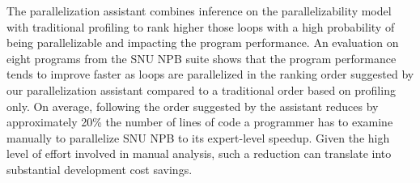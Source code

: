 
The parallelization assistant combines inference on the parallelizability model
with traditional profiling to rank higher those loops with a high probability of being parallelizable and impacting the program performance.
%
An evaluation on eight programs from the SNU NPB suite shows that
the program performance tends to improve faster as loops are parallelized in
the ranking order suggested by our parallelization assistant compared to a traditional order based on profiling only.
%
On average, following the order suggested by the assistant reduces by approximately 20\% the number of lines of code a programmer has to examine manually to parallelize SNU NPB to its expert-level speedup.
%
Given the high level of effort involved in manual analysis, such a reduction
can translate into substantial development cost savings.



